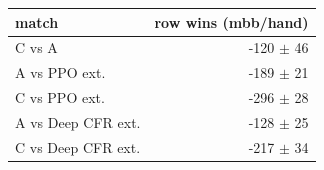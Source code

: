 \begin{tabular}{lr}
\toprule
match & row wins (mbb/hand) \\
\midrule
C vs A & -120 $\pm$ 46 \\
A vs PPO ext. & -189 $\pm$ 21 \\
C vs PPO ext. & -296 $\pm$ 28 \\
A vs Deep CFR ext. & -128 $\pm$ 25 \\
C vs Deep CFR ext. & -217 $\pm$ 34 \\
\bottomrule
\end{tabular}

